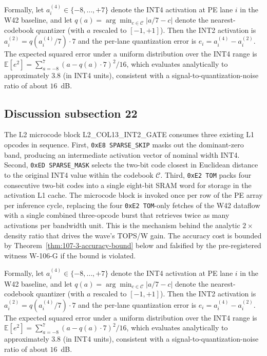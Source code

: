 Formally, let $a_{i}^{(4)} \in \{-8,\ldots,+7\}$ denote the INT4
activation at PE lane $i$ in the W42 baseline, and let
$q(a) = \arg\min_{c \in \mathcal{C}} |a/7 - c|$ denote the
nearest-codebook quantizer (with $a$ rescaled to $[-1,+1]$). Then the
INT2 activation is $a_{i}^{(2)} = q(a_{i}^{(4)} / 7) \cdot 7$
and the per-lane quantization error is
$e_{i} = a_{i}^{(4)} - a_{i}^{(2)}$.
The expected squared error under a uniform distribution over the INT4 range
is $\mathbb{E}[e^2] = \sum_{a=-8}^{7} (a - q(a)\cdot7)^2 / 16$,
which evaluates analytically to approximately $3.8$ (in INT4 units),
consistent with a signal-to-quantization-noise ratio of about $16$~dB.


\subsection{Discussion subsection 22}

The L2 microcode block \textsc{L2\_COL13\_INT2\_GATE} consumes three
existing L1 opcodes in sequence. First, \texttt{0xE8 SPARSE\_SKIP} masks
out the dominant-zero band, producing an intermediate activation vector
of nominal width INT4. Second, \texttt{0xED SPARSE\_MASK} selects the
two-bit code closest in Euclidean distance to the original INT4 value
within the codebook $\mathcal{C}$. Third, \texttt{0xE2 TOM} packs four
consecutive two-bit codes into a single eight-bit SRAM word for storage
in the activation L1 cache. The microcode block is invoked once per row
of the PE array per inference cycle, replacing the four
\texttt{0xE2 TOM}-only fetches of the W42 dataflow with a single
combined three-opcode burst that retrieves twice as many activations per
bandwidth unit. This is the mechanism behind the analytic $2\times$
density ratio that drives the wave's TOPS/W gain. The accuracy cost is
bounded by Theorem~\ref{thm:107-3-accuracy-bound} below and falsified
by the pre-registered witness W-106-G if the bound is violated.

Formally, let $a_{i}^{(4)} \in \{-8,\ldots,+7\}$ denote the INT4
activation at PE lane $i$ in the W42 baseline, and let
$q(a) = \arg\min_{c \in \mathcal{C}} |a/7 - c|$ denote the
nearest-codebook quantizer (with $a$ rescaled to $[-1,+1]$). Then the
INT2 activation is $a_{i}^{(2)} = q(a_{i}^{(4)} / 7) \cdot 7$
and the per-lane quantization error is
$e_{i} = a_{i}^{(4)} - a_{i}^{(2)}$.
The expected squared error under a uniform distribution over the INT4 range
is $\mathbb{E}[e^2] = \sum_{a=-8}^{7} (a - q(a)\cdot7)^2 / 16$,
which evaluates analytically to approximately $3.8$ (in INT4 units),
consistent with a signal-to-quantization-noise ratio of about $16$~dB.


